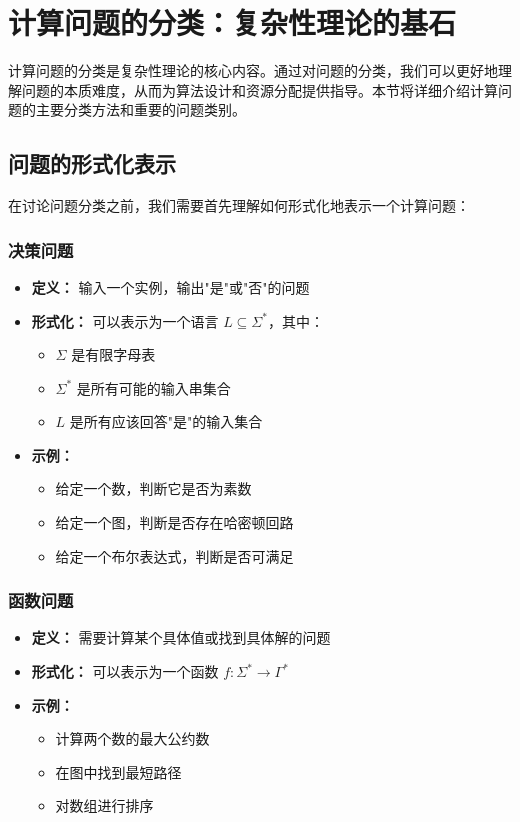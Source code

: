 \documentclass[a4paper,12pt]{ctexart}
\begin{document}
\section{计算问题的分类：复杂性理论的基石}
计算问题的分类是复杂性理论的核心内容。通过对问题的分类，我们可以更好地理解问题的本质难度，从而为算法设计和资源分配提供指导。本节将详细介绍计算问题的主要分类方法和重要的问题类别。

\subsection{问题的形式化表示}
在讨论问题分类之前，我们需要首先理解如何形式化地表示一个计算问题：

\subsubsection{决策问题}
\begin{itemize}
    \item \textbf{定义：} 输入一个实例，输出"是"或"否"的问题
    \item \textbf{形式化：} 可以表示为一个语言 $L \subseteq \Sigma^*$，其中：
        \begin{itemize}
            \item $\Sigma$ 是有限字母表
            \item $\Sigma^*$ 是所有可能的输入串集合
            \item $L$ 是所有应该回答"是"的输入集合
        \end{itemize}
    \item \textbf{示例：}
        \begin{itemize}
            \item 给定一个数，判断它是否为素数
            \item 给定一个图，判断是否存在哈密顿回路
            \item 给定一个布尔表达式，判断是否可满足
        \end{itemize}
\end{itemize}

\subsubsection{函数问题}
\begin{itemize}
    \item \textbf{定义：} 需要计算某个具体值或找到具体解的问题
    \item \textbf{形式化：} 可以表示为一个函数 $f: \Sigma^* \rightarrow \Gamma^*$
    \item \textbf{示例：}
        \begin{itemize}
            \item 计算两个数的最大公约数
            \item 在图中找到最短路径
            \item 对数组进行排序
        \end{itemize}
\end{itemize}
\end{document}
